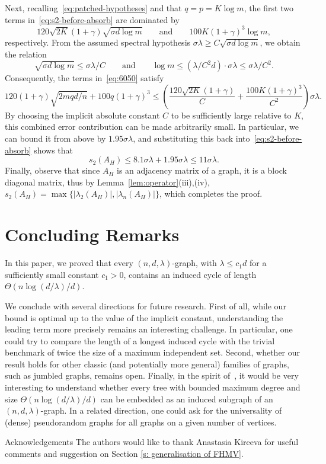 \documentclass[reqno,a4paper]{amsart}
\makeatletter
\def\paragraph{\@startsection{paragraph}{4}%
  \z@{3pt}{-\fontdimen2\font}%
  {\normalfont\bfseries}}
\theoremstyle{definition}
\makeatother
\begin{document}
Next, recalling~\eqref{eq:patched-hypotheses} and that $q = p = K\log m$, the first two terms in~\eqref{eq:s2-before-absorb} are dominated by 
\begin{equation}\label{eq:6050}
120\sqrt{2K}(1+\gamma)\sqrt{\sigma d\log m}\qquad \text{and}\qquad 100K(1+\gamma)^3\log m,    
\end{equation}
respectively. 
From the assumed spectral hypothesis $\sigma\lambda \ge C\sqrt{\sigma d\log m}$, we obtain the relation
\begin{equation}\label{eq:sigmalog}
\sqrt{\sigma d\log m} \le \sigma\lambda/C \qquad \text{and}\qquad \log m\le (\lambda/C^2 d)\cdot \sigma\lambda\le \sigma \lambda/C^2.
\end{equation}
Consequently, the terms in~\eqref{eq:6050} satisfy
\[
120(1+\gamma)\sqrt{2mqd/n} + 100q(1+\gamma)^3 \le \left( \frac{120\sqrt{2K}(1+\gamma)}{C} + \frac{100K(1+\gamma)^3}{C^2} \right)\sigma\lambda.
\]
By choosing the implicit absolute constant $C$ to be sufficiently large relative to $K$, this combined error contribution can be made arbitrarily small.
In particular, we can bound it from above by $1.95\sigma\lambda$, and substituting this back into~\eqref{eq:s2-before-absorb} shows that
\[
s_2(A_H) \le 8.1\sigma\lambda + 1.95\sigma\lambda \le 11\sigma\lambda.
\]
Finally, observe that since $A_H$ is an adjacency matrix of a graph, it is a block diagonal matrix, thus by Lemma~\ref{lem:operator}(iii),(iv), $s_2(A_H)=\max\{|\lambda_2(A_H)|,|\lambda_n(A_H)|\}$, which completes the proof.

\section{Concluding Remarks}\label{s: conclusion}

In this paper, we proved that every $(n,d,\lambda)$-graph, with $\lambda\le c_1d$ for a sufficiently small constant $c_1>0$, contains an induced cycle of length $\Theta(n\log(d/\lambda)/d)$. 

We conclude with several directions for future research. First of all, while our bound is optimal up to the value of the implicit constant, understanding the leading term more precisely remains an interesting challenge. In particular, one could try to compare the length of a longest induced cycle with the trivial benchmark of twice the size of a maximum independent set.
Second, whether our result holds for other classic (and potentially more general) families of graphs, such as jumbled graphs, remains open. Finally, in the spirit of~\cite{AKS07, arXiv:2608.06358, GH24, JKW12, M19}, it would be very interesting to understand whether every tree with bounded maximum degree and size $\Theta(n\log(d/\lambda)/d)$ can be embedded as an induced subgraph of an $(n,d,\lambda)$-graph. 
In a related direction, one could ask for the universality of (dense) pseudorandom graphs for all graphs on a given number of vertices.


\paragraph{Acknowledgements} The authors would like to thank Anastasia Kireeva for useful comments and suggestion on Section \ref{s: generalisation of FHMV}.



\end{document}
